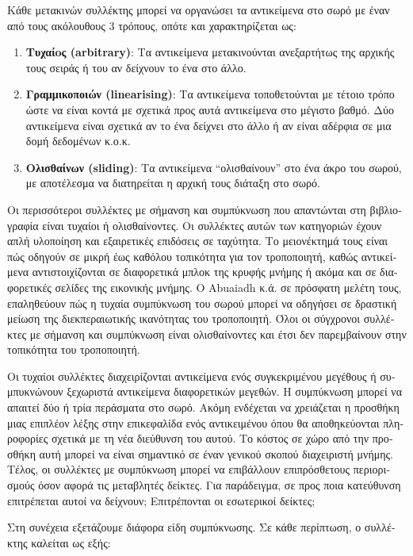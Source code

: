 \begin{greek}
Κάθε μετακινών συλλέκτης μπορεί να οργανώσει τα αντικείμενα στο σωρό με έναν από τους 
ακόλουθους 3 τρόπους, οπότε και χαρακτηρίζεται ως:
\begin{enumerate}
\item \textbf{Τυχαίoς (arbitrary)}: Τα αντικείμενα μετακινούνται ανεξαρτήτως της αρχικής 
      τους σειράς ή του αν δείχνουν το ένα στο άλλο. 
\item \textbf{Γραμμικοποιών (linearising)}: Τα αντικείμενα τοποθετούνται με τέτοιο 
      τρόπο ώστε να είναι κοντά με σχετικά προς αυτά αντικείμενα στο μέγιστο βαθμό. Δύο 
      αντικείμενα είναι σχετικά αν το ένα δείχνει στο άλλο ή αν είναι αδέρφια σε μια 
      δομή δεδομένων κ.ο.κ.
\item \textbf{Ολισθαίνων (sliding)}: Τα αντικείμενα ``ολισθαίνουν'' στο ένα άκρο του 
      σωρού, με αποτέλεσμα να διατηρείται η αρχική τους διάταξη στο σωρό. 
\end{enumerate}

Οι περισσότεροι συλλέκτες με σήμανση και συμπύκνωση που απαντώνται στη βιβλιογραφία είναι 
τυχαίοι ή ολισθαίνοντες. Οι συλλέκτες αυτών των κατηγοριών έχουν απλή υλοποίηση και 
εξαιρετικές επιδόσεις σε ταχύτητα. Το μειονέκτημά τους είναι πώς οδηγούν σε μικρή έως 
καθόλου τοπικότητα για τον τροποποιητή, καθώς αντικείμενα αντιστοιχίζονται σε διαφορετικά 
μπλοκ της κρυφής μνήμης ή ακόμα και σε διαφορετικές σελίδες της εικονικής μνήμης. Ο 
Abuaiadh κ.ά. σε πρόσφατη μελέτη τους, \cite{DBLP:conf/oopsla/AbuaiadhOPS04} επαληθεύουν 
πώς η τυχαία συμπύκνωση του σωρού μπορεί να οδηγήσει σε δραστική μείωση της διεκπεραιωτικής 
ικανότητας του τροποποιητή. Όλοι οι σύγχρονοι συλλέκτες με σήμανση και συμπύκνωση είναι 
ολισθαίνοντες και έτσι δεν παρεμβαίνουν στην τοπικότητα του τροποποιητή.

Οι τυχαίοι συλλέκτες διαχειρίζονται αντικείμενα ενός συγκεκριμένου μεγέθους ή συμπυκνώνουν 
ξεχωριστά αντικείμενα διαφορετικών μεγεθών. Η συμπύκνωση μπορεί να απαιτεί δύο ή τρία 
περάσματα στο σωρό. Ακόμη ενδέχεται να χρειάζεται η προσθήκη μιας επιπλέον λέξης στην 
επικεφαλίδα ενός αντικειμένου όπου θα αποθηκεύονται πληροφορίες σχετικά με τη νέα διεύθυνση 
του αυτού. Το κόστος σε χώρο από την προσθήκη αυτή μπορεί να είναι σημαντικό σε έναν γενικού 
σκοπού διαχειριστή μνήμης. Τέλος, οι συλλέκτες με συμπύκνωση μπορεί να επιβάλλουν 
επιπρόσθετους περιορισμούς όσον αφορά τις μεταβλητές δείκτες. Για παράδειγμα, σε προς ποια 
κατεύθυνση επιτρέπεται αυτοί να δείχνουν; Επιτρέπονται οι εσωτερικοί δείκτες;

Στη συνέχεια εξετάζουμε διάφορα είδη συμπύκνωσης. Σε κάθε περίπτωση, ο συλλέκτης καλείται 
ως εξής:


\end{greek}
